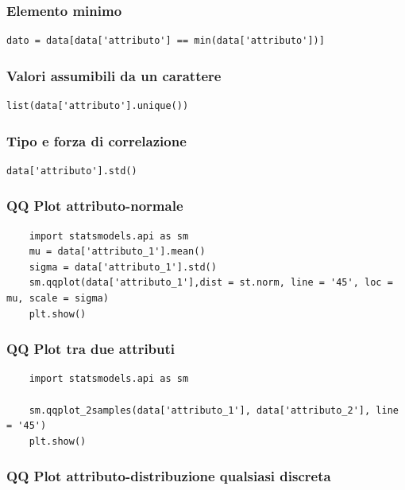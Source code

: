 \documentclass{article}
\begin{document}
\subsubsection*{Elemento minimo}

\begin{lstlisting}
dato = data[data['attributo'] == min(data['attributo'])]
\end{lstlisting}

\subsubsection*{Valori assumibili da un carattere}

\begin{lstlisting}
list(data['attributo'].unique())
\end{lstlisting}

\subsubsection*{Tipo e forza di correlazione}

\begin{lstlisting}
data['attributo'].std()
\end{lstlisting}

\subsubsection*{QQ Plot attributo-normale}

\begin{lstlisting}
    import statsmodels.api as sm
    mu = data['attributo_1'].mean()
    sigma = data['attributo_1'].std()
    sm.qqplot(data['attributo_1'],dist = st.norm, line = '45', loc = mu, scale = sigma)
    plt.show()  
\end{lstlisting}

\subsubsection*{QQ Plot tra due attributi }

\begin{lstlisting}
    import statsmodels.api as sm 

    sm.qqplot_2samples(data['attributo_1'], data['attributo_2'], line = '45')
    plt.show()
\end{lstlisting}

\subsubsection*{QQ Plot attributo-distribuzione qualsiasi discreta}
\end{document}
